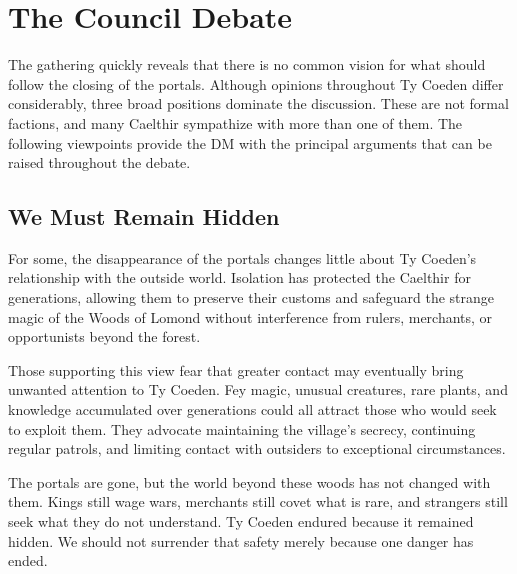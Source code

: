 \section*{The Council Debate}
{\entryfont The gathering quickly reveals that there is no common vision for what should follow the closing of the portals. Although opinions throughout Ty Coeden differ considerably, three broad positions dominate the discussion. These are not formal factions, and many Caelthir sympathize with more than one of them. The following viewpoints provide the DM with the principal arguments that can be raised throughout the debate.}
\subsection*{We Must Remain Hidden}
{\entryfont For some, the disappearance of the portals changes little about Ty Coeden's relationship with the outside world. Isolation has protected the Caelthir for generations, allowing them to preserve their customs and safeguard the strange magic of the Woods of Lomond without interference from rulers, merchants, or opportunists beyond the forest.

Those supporting this view fear that greater contact may eventually bring unwanted attention to Ty Coeden. Fey magic, unusual creatures, rare plants, and knowledge accumulated over generations could all attract those who would seek to exploit them. They advocate maintaining the village's secrecy, continuing regular patrols, and limiting contact with outsiders to exceptional circumstances.}
\begin{DndReadAloud}
	The portals are gone, but the world beyond these woods has not changed with them. Kings still wage wars, merchants still covet what is rare, and strangers still seek what they do not understand. Ty Coeden endured because it remained hidden. We should not surrender that safety merely because one danger has ended.
\end{DndReadAloud}
\eject
